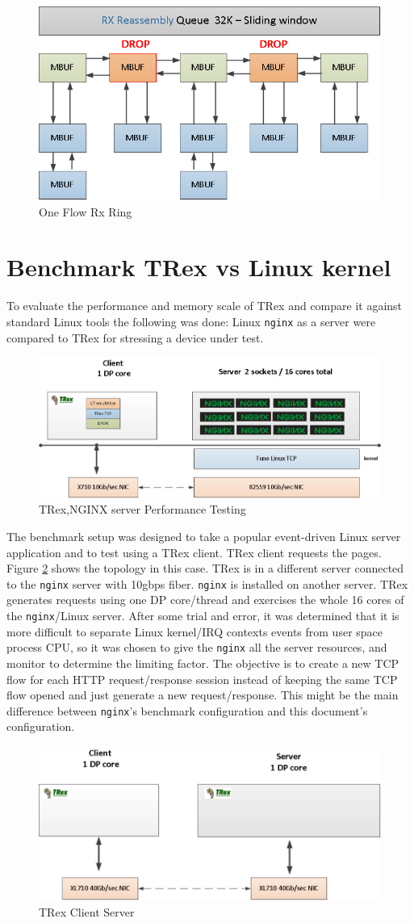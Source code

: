 \documentclass[letterpaper]{article}
\begin{document}
\begin{figure}[h]
\includegraphics[width=0.15
\textwidth, center]{t_c6.png}
\caption{One Flow Rx Ring}
\label{fig:rx_ring}
\end{figure}


\section{Benchmark  TRex vs Linux kernel}

To evaluate the performance and memory scale of TRex and compare it against standard Linux tools the following was done: 
Linux \texttt{nginx} as a server were compared to TRex for stressing a device under test.

\begin{figure}[h]
\includegraphics[width=0.3
\textwidth, center]{nginx_setup1.png}
\caption{TRex,NGINX server Performance Testing}
\label{fig:trex_nginx}
\end{figure}

The benchmark setup was designed to take a popular event-driven Linux server application and to test using a TRex client. 
TRex client requests the pages. Figure \ref{fig:trex_nginx} shows the topology in this case. TRex is in a different server connected to the \texttt{nginx} server with 10gbps fiber. 
\texttt{nginx} is installed on another server. TRex generates requests using one DP core/thread and exercises the whole 16 cores of the \texttt{nginx}/Linux server. 
After some trial and error, it was determined that it is more difficult to separate Linux kernel/IRQ contexts events from user space process CPU, 
so it was chosen to give the \texttt{nginx} all the server resources, and monitor to determine the limiting factor.
The objective is to create a new TCP flow for each HTTP request/response session instead of keeping the same TCP flow opened and just generate a new request/response. 
This might be the main difference between \texttt{nginx}'s benchmark configuration and this document's configuration. 

\begin{figure}[h]
\includegraphics[width=0.3
\textwidth, center]{nginx_setup2.png}
\caption{TRex Client Server}
\label{fig:trex_vs_trex}
\end{figure}
\end{document}
